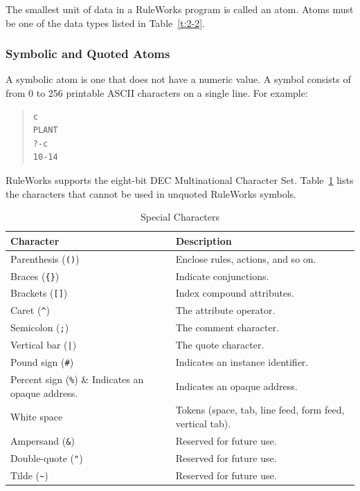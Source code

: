 The smallest unit of data in a RuleWorks program is called an
atom. Atoms must be one of the data types listed in Table~\ref{t:2-2}.

\subsubsection{Symbolic and Quoted Atoms}

A symbolic atom is one that does not have a numeric value. A symbol
consists of from 0 to 256 printable ASCII characters on a single
line. For example:

\begin{quote}
\begin{verbatim}
c
PLANT
?-c
10-14
\end{verbatim}
\end{quote}

RuleWorks supports the eight-bit DEC Multinational Character
Set. Table~\ref{t:2-3} lists the characters that cannot be used in
unquoted RuleWorks symbols.

\begin{table}[h]
  \centering
  \begin{tabular}{ll}
    \toprule
    Character & Description \\
    \midrule
    Parenthesis (\verb|()|) & Enclose rules, actions, and so on. \\
    Braces (\verb|{}|) & Indicate conjunctions. \\
    Brackets (\verb|[]|) & Index compound attributes. \\
    Caret (\verb|^|) & The attribute operator. \\
    Semicolon (\verb|;|) & The comment character. \\
    Vertical bar (\verb,|,) & The quote character. \\
    Pound sign (\verb|#|)  & Indicates an instance identifier. \\
    Percent sign (\verb|%|) & Indicates an opaque address. \\
    White space & Tokens (space, tab, line feed, form feed, vertical tab). \\
    Ampersand (\verb|&|) & Reserved for future use.  \\
    Double-quote (\verb|"|) & Reserved for future use. \\
    Tilde (\verb|~|) & Reserved for future use. \\
    \bottomrule
  \end{tabular}
  \caption{Special Characters}
  \label{t:2-3}
\end{table}


